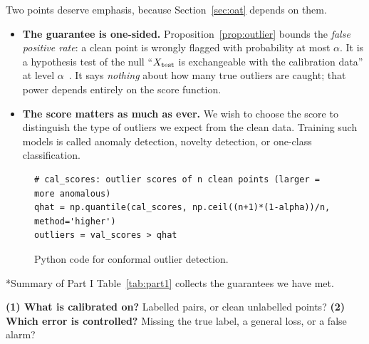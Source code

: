 \documentclass[11pt]{article}
\makeatletter
\theoremstyle{definition}
\renewcommand\subsection{\@startsection{subsection}{2}{\z@}{-3.25ex\@plus -1ex \@minus -.2ex}{1.5ex \@plus .2ex}{\normalfont\large\bfseries\color{secblue}}}
\newcommand{\Xtest}{X_{\rm test}}
\makeatother
\begin{document}
Two points deserve emphasis, because Section~\ref{sec:oat} depends on them.
\begin{nobox}
\begin{itemize}[leftmargin=1.5em]
\item \textbf{The guarantee is one-sided.} Proposition~\ref{prop:outlier} bounds the \emph{false positive rate}: a clean point is wrongly flagged with probability at most $\alpha$. It is a hypothesis test of the null ``$\Xtest$ is exchangeable with the calibration data'' at level $\alpha$~\cite{bates2023}. It says \emph{nothing} about how many true outliers are caught; that power depends entirely on the score function.
\item \textbf{The score matters as much as ever.} We wish to choose the score to distinguish the type of outliers we expect from the clean data. Training such models is called anomaly detection, novelty detection, or one-class classification.
\end{itemize}
\end{nobox}

\begin{figure}[H]
\begin{snugshade}
\begin{Verbatim}
# cal_scores: outlier scores of n clean points (larger = more anomalous)
qhat = np.quantile(cal_scores, np.ceil((n+1)*(1-alpha))/n, method='higher')
outliers = val_scores > qhat
\end{Verbatim}
\end{snugshade}
\caption{Python code for conformal outlier detection.}
\label{fig:code-outlier}
\end{figure}

\subsection*{Summary of Part I}
Table~\ref{tab:part1} collects the guarantees we have met. \begin{keybox}
\textbf{(1) What is calibrated on?} Labelled pairs, or clean unlabelled points? \quad \textbf{(2) Which error is controlled?} Missing the true label, a general loss, or a false alarm?
\end{keybox}
\end{document}
